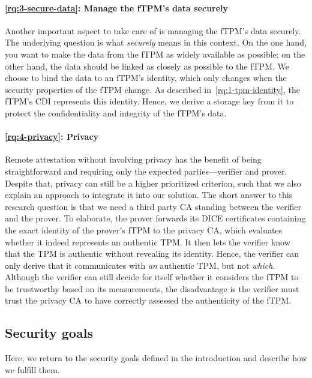 \paragraph{\ref{rq:3-secure-data}: Manage the fTPM's data securely}
Another important aspect to take care of is managing the fTPM's data securely.
The underlying question is what \emph{securely} means in this context.
On the one hand, you want to make the data from the fTPM as widely available as possible; on the other hand, the data should be linked as closely as possible to the fTPM\@.
We choose to bind the data to an fTPM's identity, which only changes when the security properties of the fTPM change.
As described in~\hyperref[par:identity]{\ref*{rq:1-tpm-identity}}, the fTPM's \ac{CDI} represents this identity.
Hence, we derive a storage key from it to protect the confidentiality and integrity of the fTPM's data.

\paragraph{\ref{rq:4-privacy}: Privacy}
Remote attestation without involving privacy has the benefit of being straightforward and requiring only the expected parties---verifier and prover.
Despite that, privacy can still be a higher prioritized criterion, such that we also explain an approach to integrate it into our solution.
The short answer to this research question is that we need a third party \ac{CA} standing between the verifier and the prover.
To elaborate, the prover forwards its \ac{DICE} certificates containing the exact identity of the prover's \ac{fTPM} to the privacy \ac{CA}, which evaluates whether it indeed represents an authentic TPM\@.
It then lets the verifier know that the TPM is authentic without revealing its identity.
Hence, the verifier can only derive that it communicates with \emph{an} authentic TPM, but not \emph{which}.
Although the verifier can still decide for itself whether it considers the \ac{fTPM} to be trustworthy based on its measurements, the disadvantage is the verifier must trust the privacy \ac{CA} to have correctly assessed the authenticity of the \ac{fTPM}.

\subsection{Security goals}

Here, we return to the security goals defined in the introduction and describe how we fulfill them.

